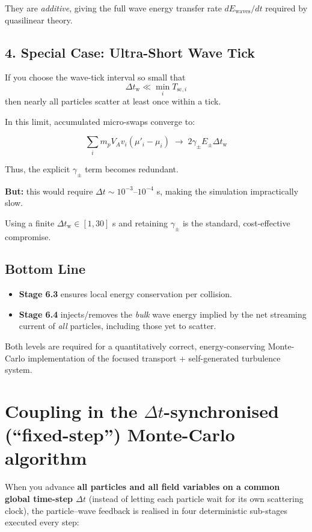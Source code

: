 {They are \emph{additive}, giving the full wave energy transfer rate \( dE_{\text{waves}}/dt \) required by quasilinear theory.

\subsection*{4. Special Case: Ultra-Short Wave Tick}

If you choose the wave-tick interval so small that
\[
\Delta t_{\mathrm{w}} \ll \min_i T_{\text{sc},i}
\]
then nearly all particles scatter at least once within a tick.

In this limit, accumulated micro-swaps converge to:

\[
\sum_i m_p V_A v_i (\mu'_i - \mu_i)
\;\longrightarrow\; 2\gamma_\pm E_\pm \Delta t_{\mathrm{w}}
\]

Thus, the explicit \( \gamma_\pm \) term becomes redundant.

\textbf{But:} this would require \( \Delta t \sim 10^{-3} \)–\( 10^{-4} \) s, making the simulation impractically slow.

Using a finite \( \Delta t_{\mathrm{w}} \in [1, 30] \) s and retaining \( \gamma_\pm \) is the standard, cost-effective compromise.

\subsection*{Bottom Line}

\begin{itemize}
  \item \textbf{Stage 6.3} ensures local energy conservation per collision.
  \item \textbf{Stage 6.4} injects/removes the \emph{bulk} wave energy implied by the net streaming current of \emph{all} particles, including those yet to scatter.
\end{itemize}

\bigskip

Both levels are required for a quantitatively correct, energy-conserving Monte-Carlo implementation of the focused transport + self-generated turbulence system.

\section*{Coupling in the $\Delta t$-synchronised (“fixed-step”) Monte-Carlo algorithm}

When you advance \textbf{all particles and all field variables on a common global time-step $\Delta t$} (instead of letting each particle wait for its own scattering clock), the particle–wave feedback is realised in four deterministic sub-stages executed every step:

}

